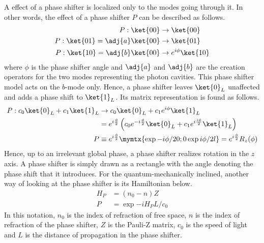 A effect of a phase shifter is localized only to the modes going through it. In other words, the effect of a phase shifter $P$ can be described as follows.
\begin{align}
P:\ket{00} &\rightarrow \ket{00}\\
P:\ket{01} = \adj{a}\ket{00} &\rightarrow \ket{01}\\
P:\ket{10} = \adj{b}\ket{00} &\rightarrow e^{i\phi}\ket{10}
\end{align}
where $\phi$ is the phase shifter angle and $\adj{a}$ and $\adj{b}$ are the creation operators for the two modes representing the photon cavities. This phase shifter model acts on the $b$-mode only. Hence, a phase shifter leaves $\ket{0}_L$ unaffected and adds a phase shift to $\ket{1}_L$. Its matrix representation is found as follows.
\begin{align}
P:c_0\ket{0}_L + c_1\ket{1}_L &\rightarrow c_0\ket{0}_L + c_1e^{i\phi}\ket{1}_L \\
&= e^{i\frac{\phi}{2}}\left(c_0e^{-i\frac{\phi}{2}}\ket{0}_L + c_1e^{i\frac{i\phi}{2}}\ket{1}_L\right)\\
P &\equiv e^{i\frac{\phi}{2}}\mymtx{\exp{-i\phi/2} 0;0 \exp{i\phi/2}l} = e^{i\frac{\phi}{2}}R_z(\phi)
\end{align}
Hence, up to an irrelevant global phase, a phase shifter realizes rotation in the $z$ axis. A phase shifter is simply drawn as a rectangle with the angle denoting the phase shift that it introduces. For the quantum-mechanically inclined, another way of looking at the phase shifter is its Hamiltonian  below.
\begin{align}
H_P &= (n_0 - n)Z\\
P &= \exp{-iH_PL/c_0}
\end{align}
In this notation, $n_0$ is the index of refraction of free space, $n$ is the index of refraction of the phase shifter, $Z$ is the Pauli-Z matrix, $c_0$ is the speed of light and $L$ is the distance of propagation in the phase shifter.

